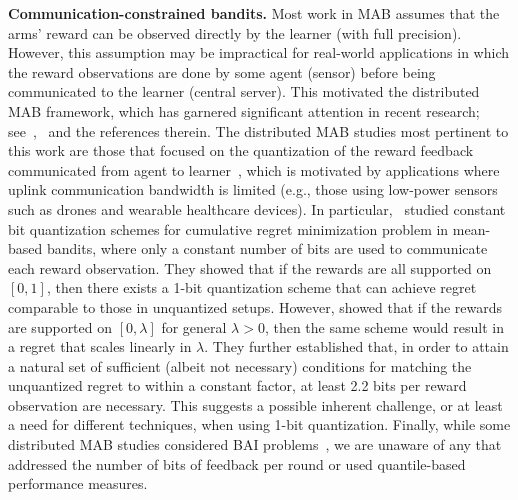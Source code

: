 \textbf{Communication-constrained bandits.}
Most work in MAB assumes that the arms' reward can be observed directly by the learner (with full precision).
However, this assumption may be impractical for real-world applications in which the reward observations are done by some agent (sensor) before being communicated to the learner (central server). 
This motivated the distributed MAB framework, which has garnered significant attention in recent research; see~\cite{amani2023distributed},~\cite[Appendix A]{salgia2023distributed} and the references therein.
The distributed MAB studies most pertinent to this work are those that focused on the quantization of the reward feedback communicated from agent to learner~\cite{vial2020one, hanna2022solving, mitra2023linear, mayekar2023communication}, which is motivated by applications where uplink communication bandwidth is limited (e.g., those using low-power sensors such as drones and wearable healthcare devices).
In particular,~\cite{vial2020one, hanna2022solving} studied constant bit
quantization schemes for
cumulative regret minimization problem in mean-based bandits, where only a constant number of bits are used to communicate each reward observation.
They showed that if the rewards are all supported on $[0, 1]$, then there exists a 1-bit quantization scheme that can achieve 
regret comparable to those in unquantized setups.
However, \cite[Sec. 3]{hanna2022solving} showed that if the rewards are supported on $[0, \lambda]$ for general $\lambda > 0$, then the same scheme would result in a regret that scales linearly in $\lambda$.
They further established that, in order to attain a natural set of sufficient (albeit not necessary) conditions for matching the unquantized regret to within a constant factor, at least 2.2 bits per reward observation are necessary.  
This suggests a possible inherent challenge, or at least a need for different techniques, when using 1-bit quantization.  
Finally, while some distributed MAB studies considered BAI problems~\cite{hillel2013distributed, karnin2013almost, tao2019collaborative, reda2022nearoptimal}, we are unaware of any that addressed the number of bits of feedback per round or used quantile-based performance measures.
